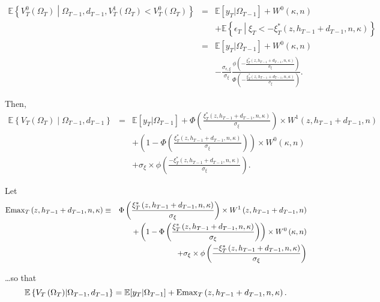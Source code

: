 \begin{eqnarray}
\mathbb{E} \left\{ V^{0}_T\left(\Omega_T\right) \middle| \Omega_{T-1}, d_{T-1}, V^{1}_T\left(\Omega_T\right) < V^{0}_T\left(\Omega_T\right) \right\}
&=& \mathbb{E} [y_T | \Omega_{T-1}] + W^0\left(\kappa, n\right) \nonumber \\
& & + \mathbb{E} \left\{\epsilon_T \middle| \xi_T < -\xi^*_T\left(z, h_{T-1} + d_{T-1}, n, \kappa \right) \right\} \nonumber \\
&=& \mathbb{E} [y_T | \Omega_{T-1}] + W^0\left(\kappa, n\right) \nonumber \\
& & - \frac{\sigma_{\epsilon, \xi}}{\sigma_\xi} \frac{\phi\left(-\frac{\xi^*_T\left(z,h_{T-1}+d_{T-1},n,\kappa\right)}{\sigma_\xi}\right)}{\Phi\left(-\frac{\xi^*_T\left(z,h_{T-1}+d_{T-1},n,\kappa\right)}{\sigma_\xi}\right)}.
\end{eqnarray}

\indent Then, 
\begin{eqnarray}
\mathbb{E} \left\{ V_T\left(\Omega_T\right) \middle| \Omega_{T-1}, d_{T-1}\right\} &=& \mathbb{E} [y_T | \Omega_{T-1}] + \Phi\left( \frac{\xi^*_T\left(z,h_{T-1}+d_{T-1},n,\kappa\right)}{\sigma_\xi}\right) \times W^1\left( z,h_{T-1}+d_{T-1},n \right) \nonumber \\
& & + \left(1 - \Phi\left( \frac{\xi^*_T\left(z,h_{T-1}+d_{T-1},n,\kappa\right)}{\sigma_\xi}\right) \right) \times  W^0\left(\kappa, n\right) \nonumber \\
& & + \sigma_\xi \times \phi\left( \frac{- \xi^*_T\left(z,h_{T-1}+d_{T-1},n,\kappa\right)}{\sigma_\xi}\right).
\end{eqnarray}

\indent Let 
\begin{eqnarray}
\operatorname{Emax}_T\left(z,h_{T-1}+d_{T-1},n,\kappa\right) &\equiv & \Phi\left( \frac{\xi^*_T\left(z,h_{T-1}+d_{T-1},n,\kappa\right)}{\sigma_\xi}\right) \times W^1\left( z,h_{T-1}+d_{T-1},n \right) \nonumber \\
& & + \left(1 - \Phi\left( \frac{\xi^*_T\left(z,h_{T-1}+d_{T-1},n,\kappa\right)}{\sigma_\xi}\right) \right) \times  W^0\left(\kappa, n\right) \nonumber \\
& & + \sigma_\xi \times \phi\left( \frac{- \xi^*_T\left(z,h_{T-1}+d_{T-1},n,\kappa\right)}{\sigma_\xi}\right) 
\end{eqnarray}

\noindent \ldots so that
\begin{equation}
\mathbb{E} \left\{ V_T\left(\Omega_T\right) \middle| \Omega_{T-1}, d_{T-1}\right\} = \mathbb{E} [y_T | \Omega_{T-1}]  + \operatorname{Emax}_T\left(z,h_{T-1}+d_{T-1},n,\kappa\right).  
\end{equation}

